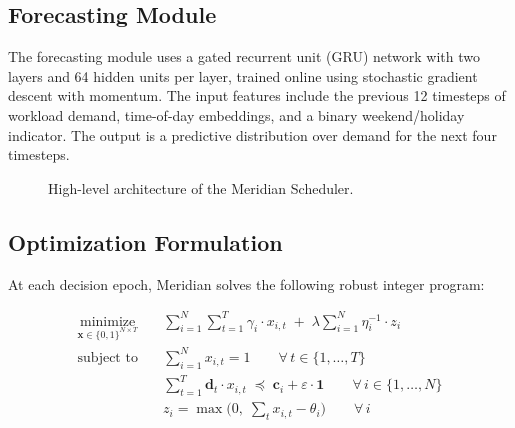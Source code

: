\documentclass[12pt,oneside]{book}
\begin{document}
\subsection{Forecasting Module}

The forecasting module uses a gated recurrent unit (GRU) network with two
layers and 64 hidden units per layer, trained online using stochastic gradient
descent with momentum. The input features include the previous 12 timesteps of
workload demand, time-of-day embeddings, and a binary weekend/holiday indicator.
The output is a predictive distribution over demand for the next four timesteps.

\begin{figure}[htbp]
\centering
\singlespacing
{}
\caption{High-level architecture of the Meridian Scheduler.}
\label{fig:meridian}
\end{figure}

\subsection{Optimization Formulation}

At each decision epoch, Meridian solves the following robust integer program:

\begin{equation}
\label{eq:rip}
\begin{aligned}
\operatorname*{minimize}_{\mathbf{x} \in \{0,1\}^{N \times T}} \quad
  & \sum_{i=1}^{N} \sum_{t=1}^{T} \gamma_i \cdot x_{i,t}
  \;+\;
  \lambda \sum_{i=1}^{N} \eta_i^{-1} \cdot z_i \\[6pt]
\text{subject to} \quad
  & \sum_{i=1}^{N} x_{i,t} = 1 \qquad \forall\, t \in \{1,\dots,T\} \\
  & \sum_{t=1}^{T} \mathbf{d}_t \cdot x_{i,t}
      \;\preceq\; \mathbf{c}_i + \varepsilon\cdot \mathbf{1}
      \qquad \forall\, i \in \{1,\dots,N\} \\
  & z_i = \max\!\bigl(0,\; \textstyle\sum_{t} x_{i,t} - \theta_i\bigr)
      \qquad \forall\, i
\end{aligned}
\end{equation}
\end{document}
